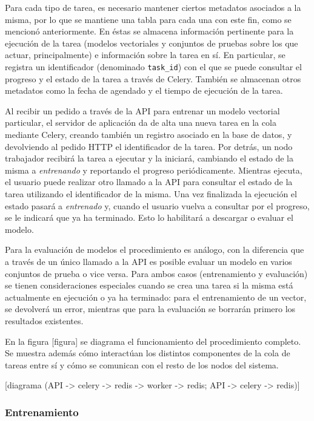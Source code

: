 Para cada tipo de tarea, es necesario mantener ciertos metadatos asociados a la misma, por lo que se
mantiene una tabla para cada una con este fin, como se mencionó anteriormente. En éstas se almacena
información pertinente para la ejecución de la tarea (modelos vectoriales y conjuntos de pruebas
sobre los que actuar, principalmente) e información sobre la tarea en sí. En particular, se registra
un identificador (denominado \texttt{task\_id}) con el que se puede consultar el progreso y el
estado de la tarea a través de Celery. También se almacenan otros metadatos como la fecha de
agendado y el tiempo de ejecución de la tarea.

Al recibir un pedido a través de la API para entrenar un modelo vectorial particular, el servidor de
aplicación da de alta una nueva tarea en la cola mediante Celery, creando también un registro
asociado en la base de datos, y devolviendo al pedido HTTP el identificador de la tarea. Por detrás,
un nodo trabajador recibirá la tarea a ejecutar y la iniciará, cambiando el estado de la misma a
\textit{entrenando} y reportando el progreso periódicamente. Mientras ejecuta, el usuario puede
realizar otro llamado a la API para consultar el estado de la tarea utilizando el identificador de
la misma. Una vez finalizada la ejecución el estado pasará a \textit{entrenado} y, cuando el
usuario vuelva a consultar por el progreso, se le indicará que ya ha terminado. Esto lo habilitará a
descargar o evaluar el modelo.

Para la evaluación de modelos el procedimiento es análogo, con la diferencia que a través de un
único llamado a la API es posible evaluar un modelo en varios conjuntos de prueba o vice versa.
Para ambos casos (entrenamiento y evaluación) se tienen consideraciones especiales cuando se crea
una tarea si la misma está actualmente en ejecución o ya ha terminado: para el entrenamiento de un
vector, se devolverá un error, mientras que para la evaluación se borrarán primero los resultados
existentes.

En la figura [figura] se diagrama el funcionamiento del procedimiento completo. Se muestra además
cómo interactúan los distintos componentes de la cola de tareas entre sí y cómo se comunican con el
resto de los nodos del sistema.

[diagrama (API -> celery -> redis -> worker -> redis; API -> celery -> redis)]


\subsubsection{Entrenamiento}

